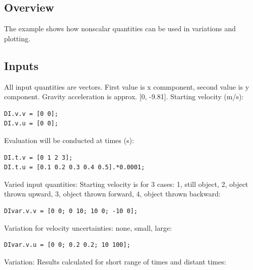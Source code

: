 \startcontents[localtoc]



{}
\subsection*{Overview}



The example shows how nonscalar quantities can be used in variations and
plotting.



{}
\subsection*{Inputs}



All input quantities are vectors. First value is x commponent, second value is
y component. Gravity acceleration is approx. [0, -9.81].
Starting velocity (m/s):

\begin{lstlisting}
DI.v.v = [0 0];
DI.v.u = [0 0];
\end{lstlisting}


Evaluation will be conducted at times (s):

\begin{lstlisting}
DI.t.v = [0 1 2 3];
DI.t.u = [0.1 0.2 0.3 0.4 0.5].*0.0001;
\end{lstlisting}


Varied input quantities:
Starting velocity is for 3 cases:
 1, still object,
 2, object thrown upward,
 3, object thrown forward,
 4, object thrown backward:

\begin{lstlisting}
DIvar.v.v = [0 0; 0 10; 10 0; -10 0];
\end{lstlisting}


Variation for velocity uncertainties: none, small, large:

\begin{lstlisting}
DIvar.v.u = [0 0; 0.2 0.2; 10 100];
\end{lstlisting}


Variation: Results calculated for short range of times and distant times:

